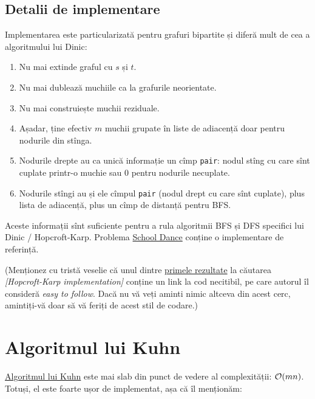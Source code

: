 \documentclass[../main.tex]{subfiles}
\begin{document}
\subsection{Detalii de implementare}

Implementarea este particularizată pentru grafuri bipartite și diferă mult de cea a algoritmului lui Dinic:

\begin{enumerate}
  \item Nu mai extinde graful cu $s$ și $t$.

  \item Nu mai dublează muchiile ca la grafurile neorientate.

  \item Nu mai construiește muchii reziduale.

  \item Așadar, ține efectiv $m$ muchii grupate în liste de adiacență doar pentru nodurile din stînga.

  \item Nodurile drepte au ca unică informație un cîmp \texttt{pair}: nodul stîng cu care sînt cuplate printr-o muchie sau 0 pentru nodurile necuplate.

  \item Nodurile stîngi au și ele cîmpul \texttt{pair} (nodul drept cu care sînt cuplate), plus lista de adiacență, plus un cîmp de distanță pentru BFS.
\end{enumerate}

Aceste informații sînt suficiente pentru a rula algoritmii BFS și DFS specifici lui Dinic / Hopcroft-Karp. Problema \hyperref[problem:school-dance]{School Dance} conține o implementare de referință.

(Menționez cu tristă veselie că unul dintre \href{https://codeforces.com/blog/entry/93824}{primele rezultate} la căutarea \textit{[Hopcroft-Karp implementation]} conține un link la cod necitibil, pe care autorul îl consideră \textit{easy to follow}. Dacă nu vă veți aminti nimic altceva din acest cerc, amintiți-vă doar să vă feriți de acest stil de codare.)

\section{Algoritmul lui Kuhn}

\href{https://cp-algorithms.com/graph/kuhn_maximum_bipartite_matching.html}{Algoritmul lui Kuhn} este mai slab din punct de vedere al complexității: $\mathcal{O}(mn)$. Totuși, el este foarte ușor de implementat, așa că îl menționăm:
\end{document}
